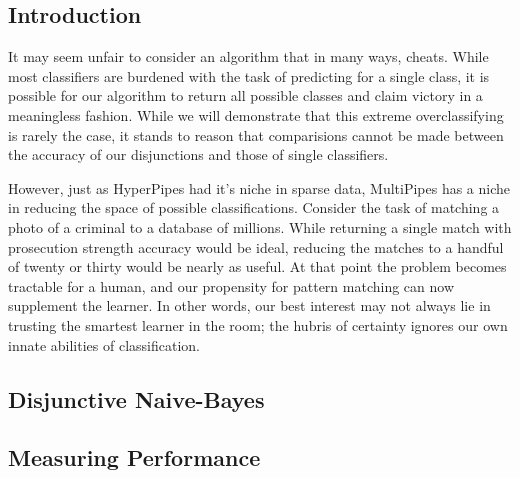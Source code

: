 \subsection{Introduction}
It may seem unfair to consider an algorithm that in many ways, cheats. While most classifiers are burdened with the task of predicting for a single class, it is possible for our algorithm to return all possible classes and claim victory in a meaningless fashion. While we will demonstrate that this extreme overclassifying is rarely the case, it stands to reason that comparisions cannot be made between the accuracy of our disjunctions and those of single classifiers.

However, just as HyperPipes had it's niche in sparse data, MultiPipes has a niche in reducing the space of possible classifications. Consider the task of matching a photo of a criminal to a database of millions. While returning a single match with prosecution strength accuracy would be ideal, reducing the matches to a handful of twenty or thirty would be nearly as useful. At that point the problem becomes tractable for a human, and our propensity for pattern matching can now supplement the learner. In other words, our best interest may not always lie in trusting the smartest learner in the room; the hubris of certainty ignores our own innate abilities of classification.

\subsection{Disjunctive Naive-Bayes}
\subsection{Measuring Performance}
